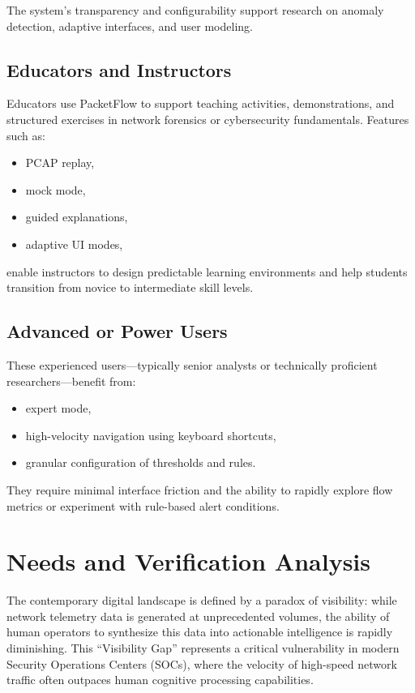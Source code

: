 \documentclass[
    11pt, 
    a4paper, 
    parskip=half, 
    headsepline,       %
    DIV=12             %
]{scrartcl}
\begin{document}
The system's transparency and configurability support research on anomaly detection, adaptive interfaces, and user modeling.

\subsection{Educators and Instructors}
Educators use PacketFlow to support teaching activities, demonstrations, and structured exercises in network forensics or cybersecurity fundamentals. Features such as:
\begin{itemize}
    \item PCAP replay,
    \item mock mode,
    \item guided explanations,
    \item adaptive UI modes,
\end{itemize}
enable instructors to design predictable learning environments and help students transition from novice to intermediate skill levels.

\subsection{Advanced or Power Users}
These experienced users---typically senior analysts or technically proficient researchers---benefit from:
\begin{itemize}
    \item expert mode,
    \item high-velocity navigation using keyboard shortcuts,
    \item granular configuration of thresholds and rules.
\end{itemize}

They require minimal interface friction and the ability to rapidly explore flow metrics or experiment with rule-based alert conditions.


\section{Needs and Verification Analysis}

The contemporary digital landscape is defined by a paradox of visibility: while network telemetry data is generated at unprecedented volumes, the ability of human operators to synthesize this data into actionable intelligence is rapidly diminishing. This “Visibility Gap” represents a critical vulnerability in modern Security Operations Centers (SOCs), where the velocity of high-speed network traffic often outpaces human cognitive processing capabilities.
\end{document}

